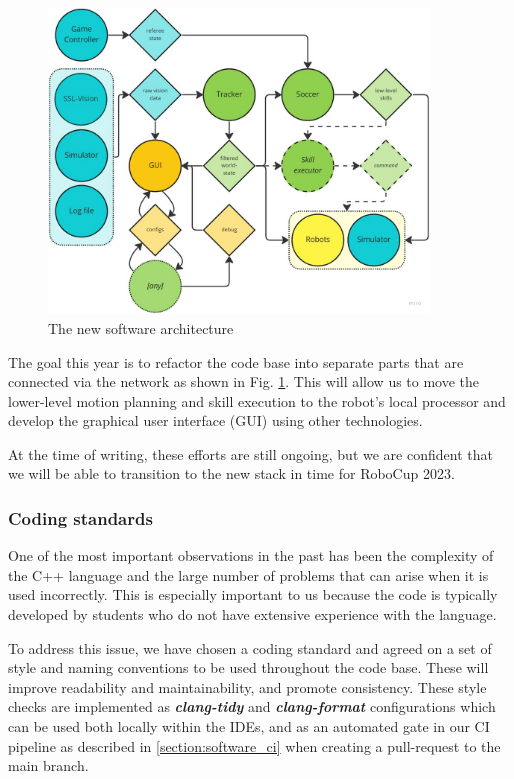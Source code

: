 \documentclass[runningheads]{llncs}
\begin{document}
\begin{figure}
	\centering
	\includegraphics[width=0.9\textwidth]{images/software-architecture.jpg}
	\caption{The new software architecture}
	\label{fig:software-architecture}
\end{figure}

The goal this year is to refactor the code base into separate parts that are connected via the network as shown in Fig. \ref{fig:software-architecture}. This will allow us to move the lower-level motion planning and skill execution to the robot's local processor and develop the graphical user interface (GUI) using other technologies.

At the time of writing, these efforts are still ongoing, but we are confident that we will be able to transition to the new stack in time for RoboCup 2023.

\subsubsection{Coding standards}
\label{section:software_coding_standard}
One of the most important observations in the past has been the complexity of the C++ language and the large number of problems that can arise when it is used incorrectly. This is especially important to us because the code is typically developed by students who do not have extensive experience with the language.

To address this issue, we have chosen a coding standard \cite{ref_cppbestpractices} and agreed on a set of style and naming conventions to be used throughout the code base. These will improve readability and maintainability, and promote consistency. These style checks are implemented as \textbf{\textit{clang-tidy}} and \textbf{\textit{clang-format}} configurations which can be used both locally within the IDEs, and as an automated gate in our CI pipeline as described in \ref{section:software_ci} when creating a pull-request to the main branch.
\end{document}
